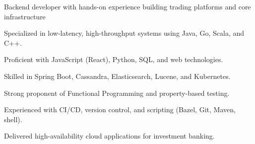 \begin{cvitems}
\sectionspace
\sectionspace
\vspace{1mm}
	\fontsize{11pt}{1.4em}\bodyfontlight\upshape\color{text}
        \item {Backend developer with hands-on experience building trading platforms and core infrastructure}
        \item {Specialized in low-latency, high-throughput systems using Java, Go, Scala, and C++.}
        \item {Proficient with JavaScript (React), Python, SQL, and web technologies.}
        \item {Skilled in Spring Boot, Cassandra, Elasticsearch, Lucene, and Kubernetes.}
        \item {Strong proponent of Functional Programming and property-based testing.}
        \item {Experienced with CI/CD, version control, and scripting (Bazel, Git, Maven, shell).}
        \item {Delivered high-availability cloud applications for investment banking.}
        \end{cvitems}
\vspace{1mm}
\sectionspace
